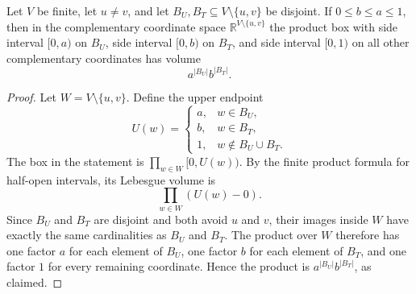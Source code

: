 \begin{helper}
Let \(V\) be finite, let \(u\ne v\), and let
\(B_U,B_T\subseteq V\setminus\{u,v\}\) be disjoint.  If
\(0\le b\le a\le1\), then in the complementary coordinate space
\(\mathbb R^{V\setminus\{u,v\}}\) the product box with side interval
\([0,a)\) on \(B_U\), side interval \([0,b)\) on \(B_T\), and side interval
\([0,1)\) on all other complementary coordinates has volume
\[
a^{|B_U|}b^{|B_T|}.
\]
\end{helper}
\begin{proof}
Let \(W=V\setminus\{u,v\}\).  Define the upper endpoint
\[
U(w)=
\begin{cases}
a,&w\in B_U,\\
b,&w\in B_T,\\
1,&w\notin B_U\cup B_T.
\end{cases}
\]
The box in the statement is \(\prod_{w\in W}[0,U(w))\).  By the finite
product formula for half-open intervals, its Lebesgue volume is
\[
\prod_{w\in W} (U(w)-0).
\]
Since \(B_U\) and \(B_T\) are disjoint and both avoid \(u\) and \(v\), their
images inside \(W\) have exactly the same cardinalities as \(B_U\) and
\(B_T\).  The product over \(W\) therefore has one factor \(a\) for each
element of \(B_U\), one factor \(b\) for each element of \(B_T\), and one
factor \(1\) for every remaining coordinate.  Hence the product is
\(a^{|B_U|}b^{|B_T|}\), as claimed.
\end{proof}
